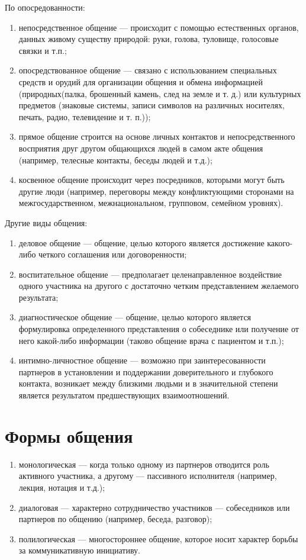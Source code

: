 По опосредованности:
\begin{enumerate}
	\item непосредственное общение — происходит с помощью естественных органов, данных живому существу природой: руки, голова, туловище, голосовые связки и т.п.;
	\item опосредствованное общение — связано с использованием специальных средств и орудий для организации общения и обмена информацией (природных(палка, брошенный камень, след на земле и т. д.) или культурных предметов (знаковые системы, записи символов на различных носителях, печать, радио, телевидение и т. п.));
	\item прямое общение строится на основе личных контактов и непосредственного восприятия друг другом общающихся людей в самом акте общения (например, телесные контакты, беседы людей и т.д.);
	\item косвенное общение происходит через посредников, которыми могут быть другие люди (например, переговоры между конфликтующими сторонами на межгосударственном, межнациональном, групповом, семейном уровнях).
\end{enumerate}

Другие виды общения:
\begin{enumerate}
	\item деловое общение — общение, целью которого является достижение какого-либо четкого соглашения или договоренности;
	\item воспитательное общение — предполагает целенаправленное воздействие одного участника на другого с достаточно четким представлением желаемого результата;
	\item диагностическое общение — общение, целью которого является формулировка определенного представления о собеседнике или получение от него какой-либо информации (таково общение врача с пациентом и т.п.);
	\item интимно-личностное общение — возможно при заинтересованности партнеров в установлении и поддержании доверительного и глубокого контакта, возникает между близкими людьми и в значительной степени является результатом предшествующих взаимоотношений.
\end{enumerate}

\section{Формы общения}
\begin{enumerate}
	\item монологическая — когда только одному из партнеров отводится роль активного участника, а другому — пассивного исполнителя (например, лекция, нотация и т.д.);
	\item диалоговая — характерно сотрудничество участников — собеседников или партнеров по общению (например, беседа, разговор);
	\item полилогическая — многостороннее общение, которое носит характер борьбы за коммуникативную инициативу.
\end{enumerate}

